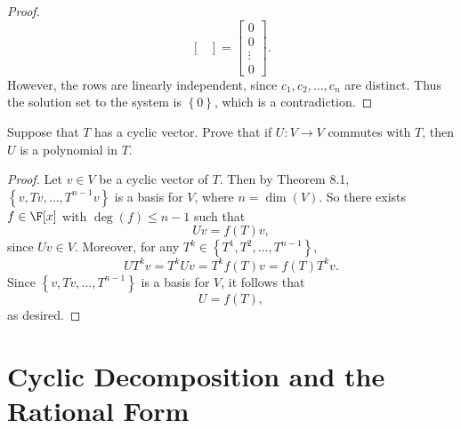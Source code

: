 \documentclass[linearalgebra]{subfiles}
\begin{document}
\begin{proof}
\begin{equation*}
\begin{bmatrix}
            \end{bmatrix}
            =
            \begin{bmatrix}
                0 \\ 0 \\ \vdots \\ 0
            \end{bmatrix}.
        \end{equation*}
        However, the rows are linearly independent, since $c_1, c_2, \ldots, c_n$ are distinct. Thus the solution set to the system is $\left\lbrace 0 \right\rbrace$, which is a contradiction.
    \end{proof}

    \begin{example}
        Suppose that $T$ has a cyclic vector. Prove that if $U:V\to V$ commutes with $T$, then $U$ is a polynomial in $T$.
    \end{example}

    \begin{proof}
        Let $v\in V$ be a cyclic vector of $T$. Then by Theorem 8.1, $\left\lbrace v, Tv, \ldots, T^{n-1}v \right\rbrace $ is a basis for $V$, where $n=\dim(V)$. So there exists $f\in\F[x]$ with $\deg(f)\leq n-1$ such that
        \begin{equation*}
            Uv = f(T)v,
        \end{equation*}
        since $Uv\in V$. Moreover, for any $T^k\in \left\lbrace T^1, T^2, \ldots, T^{n-1} \right\rbrace $,
        \begin{equation*}
            UT^kv = T^kUv = T^kf(T)v = f(T)T^kv.
        \end{equation*}
        Since $\left\lbrace v, Tv, \ldots, T^{n-1} \right\rbrace$ is a basis for $V$, it follows that
        \begin{equation*}
            U = f(T),
        \end{equation*}
        as desired.
    \end{proof}
    
    \section{Cyclic Decomposition and the Rational Form}
    
\end{document}

